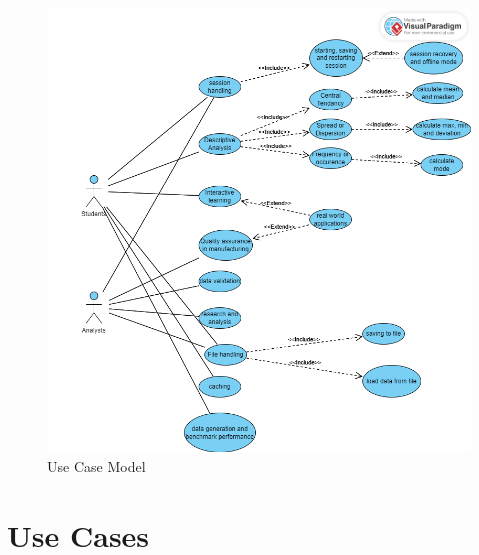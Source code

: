 \documentclass[12pt,letterpaper]{report}
\begin{document}
\begin{figure}[h]
    \begin{center}
    \includegraphics[width=0.75\linewidth]{usecase.png}
    \end{center}
       \caption{Use Case Model \label{Use Case Model}}
\end{figure}

\section{Use Cases}
\end{document}
